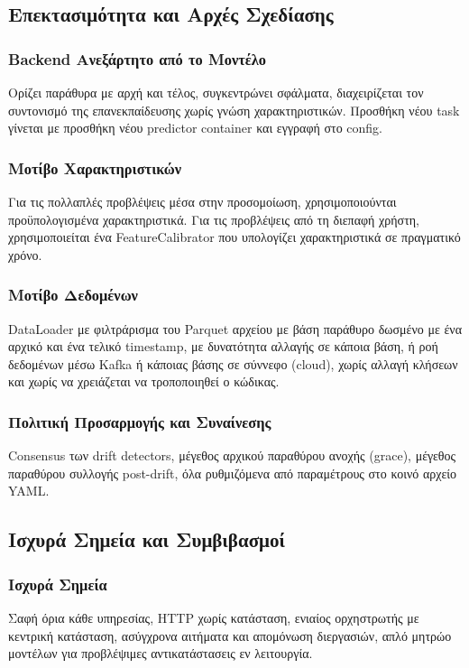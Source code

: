 \subsection*{Επεκτασιμότητα και Αρχές Σχεδίασης}

\subsubsection*{Backend Ανεξάρτητο από το Μοντέλο}
Ορίζει παράθυρα με αρχή και τέλος, συγκεντρώνει σφάλματα, διαχειρίζεται τον συντονισμό της επανεκπαίδευσης χωρίς γνώση χαρακτηριστικών.
Προσθήκη νέου task γίνεται με προσθήκη νέου predictor container και εγγραφή στο config.

\subsubsection*{Μοτίβο Χαρακτηριστικών}
Για τις πολλαπλές προβλέψεις μέσα στην προσομοίωση, χρησιμοποιούνται προϋπολογισμένα χαρακτηριστικά.
Για τις προβλέψεις από τη διεπαφή χρήστη, χρησιμοποιείται ένα FeatureCalibrator που υπολογίζει χαρακτηριστικά σε πραγματικό χρόνο.

\subsubsection*{Μοτίβο Δεδομένων}
DataLoader με φιλτράρισμα του Parquet αρχείου με βάση παράθυρο δωσμένο με ένα αρχικό και ένα τελικό timestamp, με δυνατότητα αλλαγής σε κάποια βάση, ή ροή δεδομένων μέσω Kafka ή κάποιας βάσης σε σύννεφο (cloud), χωρίς αλλαγή κλήσεων και χωρίς να χρειάζεται να τροποποιηθεί ο κώδικας.

\subsubsection*{Πολιτική Προσαρμογής και Συναίνεσης}
Consensus των drift detectors, μέγεθος αρχικού παραθύρου ανοχής (grace), μέγεθος παραθύρου συλλογής post-drift, όλα ρυθμιζόμενα από παραμέτρους στο κοινό αρχείο YAML.

\subsection*{Ισχυρά Σημεία και Συμβιβασμοί}

\subsubsection*{Ισχυρά Σημεία}
Σαφή όρια κάθε υπηρεσίας, HTTP χωρίς κατάσταση, ενιαίος ορχηστρωτής με κεντρική κατάσταση, ασύγχρονα αιτήματα και απομόνωση διεργασιών, απλό μητρώο μοντέλων για προβλέψιμες αντικατάστασεις εν λειτουργία.

